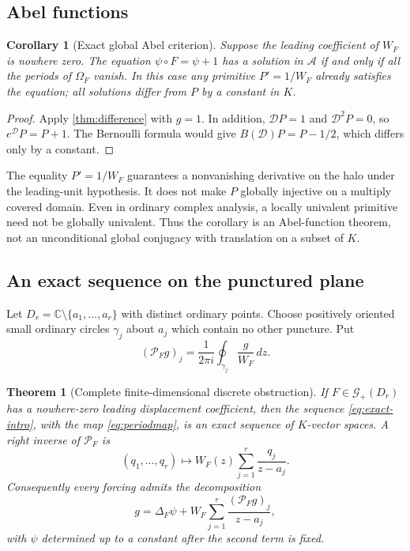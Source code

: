 \documentclass[11pt,a4paper]{article}
\numberwithin{equation}{section}
\newtheorem{theorem}{Theorem}[section]
\newtheorem{corollary}[corollary]{Corollary}
\theoremstyle{definition}
\theoremstyle{remark}
\newcommand{\C}{\mathbb C}
\newcommand{\A}{\mathcal A}
\newcommand{\G}{\mathcal G}
\newcommand{\DD}{\mathscr D}
\begin{document}
\subsection{Abel functions}

\begin{corollary}[Exact global Abel criterion]\label{cor:abel}
Suppose the leading coefficient of $W_F$ is nowhere zero.  The equation
$\psi\circ F=\psi+1$ has a solution in $\A$ if and only if all the
periods of $\Omega_F$ vanish.  In this case any primitive $P'=1/W_F$
already satisfies the equation; all solutions differ from $P$ by a
constant in $K$.
\end{corollary}
\begin{proof}
Apply \cref{thm:difference} with $g=1$.  In addition,
$\DD P=1$ and $\DD^2P=0$, so
$e^{\DD}P=P+1$.  The Bernoulli formula would give
$B(\DD)P=P-1/2$, which differs only by a constant.
\end{proof}

The equality $P'=1/W_F$ guarantees a nonvanishing derivative on the halo
under the leading-unit hypothesis.  It does not make $P$ globally
injective on a multiply covered domain.  Even in ordinary complex analysis,
a locally univalent primitive need not be globally univalent.  Thus the
corollary is an Abel-function theorem, not an unconditional global
conjugacy with translation on a subset of $K$.

\subsection{An exact sequence on the punctured plane}

Let $D_r=\C\setminus\{a_1,\ldots,a_r\}$ with distinct ordinary points.
Choose positively oriented small ordinary circles $\gamma_j$ about $a_j$
which contain no other puncture.  Put
\begin{equation}\label{eq:periodmap}
 (\mathcal P_Fg)_j=\frac1{2\pi i}
       \oint_{\gamma_j}\frac{g}{W_F}\,dz.
\end{equation}

\begin{theorem}[Complete finite-dimensional discrete obstruction]
\label{thm:exact-sequence}
If $F\in\G_+(D_r)$ has a nowhere-zero leading displacement coefficient,
then the sequence \eqref{eq:exact-intro}, with the map
\eqref{eq:periodmap}, is an exact sequence of $K$-vector spaces.
A right inverse of $\mathcal P_F$ is
\begin{equation}\label{eq:rightinverse}
 (q_1,\ldots,q_r)\longmapsto
       W_F(z)\sum_{j=1}^r\frac{q_j}{z-a_j}.
\end{equation}
Consequently every forcing admits the decomposition
\begin{equation}\label{eq:forcing-decomposition}
 g=\Delta_F\psi+
       W_F\sum_{j=1}^r\frac{(\mathcal P_Fg)_j}{z-a_j},
\end{equation}
with $\psi$ determined up to a constant after the second term is fixed.
\end{theorem}
\end{document}
